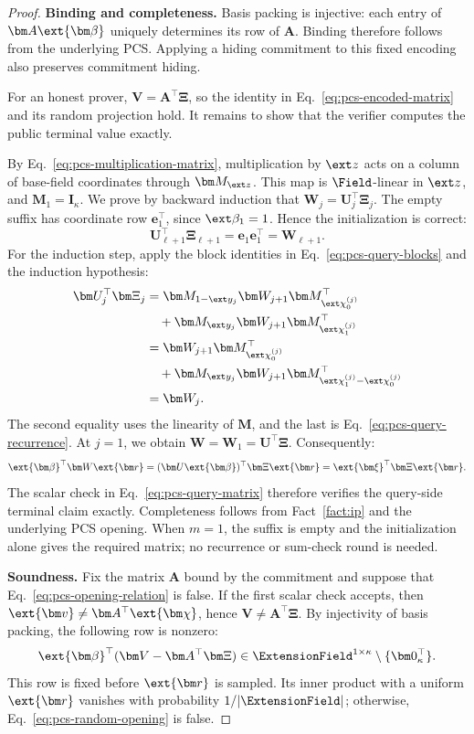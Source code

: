 \begin{proof}
\noindent\textbf{Binding and completeness.}
Basis packing is injective: each entry of
\(\bm A\ext{\bm\beta}\) uniquely determines its row of
\(\bm A\). Binding therefore follows from the underlying PCS.
Applying a hiding commitment to this fixed encoding also preserves
commitment hiding.

For an honest prover,
\(\bm V=\bm A^\top\bm\Xi\), so the identity in
Eq.~\eqref{eq:pcs-encoded-matrix} and its random projection hold.
It remains to show that the verifier computes the public terminal
value exactly.

By Eq.~\eqref{eq:pcs-multiplication-matrix}, multiplication by
\(\ext z\) acts on a column of base-field coordinates through
\(\bm M_{\ext z}\). This map is \(\Field\)-linear in \(\ext z\),
and \(\bm M_{1}=\bm I_\kappa\).
We prove by backward induction that
\(\bm W_j=\bm U_j^\top\bm\Xi_j\).
The empty suffix has coordinate row \(\bm e_1^\top\), since
\(\ext\beta_1=1\). Hence the initialization is correct:
\[
    \bm U_{\ell+1}^\top\bm\Xi_{\ell+1}
    =\bm e_1\bm e_1^\top
    =\bm W_{\ell+1}.
\]
For the induction step, apply the block identities in
Eq.~\eqref{eq:pcs-query-blocks} and the induction hypothesis:
\[
\begin{aligned}
    \bm U_j^\top\bm\Xi_j
    &=\bm M_{1-\ext y_j}\bm W_{j+1}
        \bm M_{\ext\chi^{(j)}_0}^\top\\
    &\quad{}+\bm M_{\ext y_j}\bm W_{j+1}
        \bm M_{\ext\chi^{(j)}_1}^\top\\
    &=\bm W_{j+1}\bm M_{\ext\chi^{(j)}_0}^\top\\
    &\quad{}+\bm M_{\ext y_j}\bm W_{j+1}
        \bm M_{\ext\chi^{(j)}_1-\ext\chi^{(j)}_0}^\top\\
    &=\bm W_j.
\end{aligned}
\]
The second equality uses the linearity of \(\bm M\), and the
last is Eq.~\eqref{eq:pcs-query-recurrence}.
At \(j=1\), we obtain
\(\bm W=\bm W_1=\bm U^\top\bm\Xi\). Consequently:
\[
    \ext{\bm\beta}^\top\bm W\ext{\bm r}
    =(\bm U\ext{\bm\beta})^\top\bm\Xi\ext{\bm r}
    =\ext{\bm\xi}^\top\bm\Xi\ext{\bm r}.
\]
The scalar check in Eq.~\eqref{eq:pcs-query-matrix} therefore
verifies the query-side terminal claim exactly. Completeness
follows from Fact~\ref{fact:ip} and the underlying PCS opening.
When \(m=1\), the suffix is empty and the initialization alone
gives the required matrix; no recurrence or sum-check round is
needed.

\smallskip\noindent\textbf{Soundness.}
Fix the matrix \(\bm A\) bound by the commitment and suppose that
Eq.~\eqref{eq:pcs-opening-relation} is false.
If the first scalar check accepts, then
\(\ext{\bm v}\neq\bm A^\top\ext{\bm\chi}\), hence
\(\bm V\neq\bm A^\top\bm\Xi\).
By injectivity of basis packing, the following row is nonzero:
\[
    \ext{\bm\beta}^{\top}
    (\bm V-\bm A^\top\bm\Xi)
    \in\ExtensionField^{1\times\kappa}\setminus\{\bm0_\kappa^\top\}.
\]
This row is fixed before \(\ext{\bm r}\) is sampled. Its inner
product with a uniform \(\ext{\bm r}\) vanishes with probability
\(1/|\ExtensionField|\); otherwise,
Eq.~\eqref{eq:pcs-random-opening} is false.


\end{proof}
